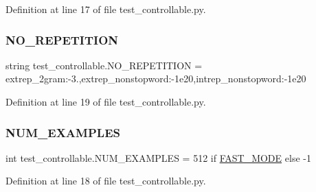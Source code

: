 Definition at line 17 of file test\+\_\+controllable.\+py.

\mbox{\label{namespacetest__controllable_aab6d0af3084ea9ec5a2deb23ae724eb3}} 
\subsubsection{\texorpdfstring{N\+O\+\_\+\+R\+E\+P\+E\+T\+I\+T\+I\+ON}{NO\_REPETITION}}
{\footnotesize\ttfamily string test\+\_\+controllable.\+N\+O\+\_\+\+R\+E\+P\+E\+T\+I\+T\+I\+ON = \textquotesingle{}extrep\+\_\+2gram\+:-\/3.,extrep\+\_\+nonstopword\+:-\/1e20,intrep\+\_\+nonstopword\+:-\/1e20\textquotesingle{}}



Definition at line 19 of file test\+\_\+controllable.\+py.

\mbox{\label{namespacetest__controllable_a7482064eb69e2d38391c4be1fc81e234}} 
\subsubsection{\texorpdfstring{N\+U\+M\+\_\+\+E\+X\+A\+M\+P\+L\+ES}{NUM\_EXAMPLES}}
{\footnotesize\ttfamily int test\+\_\+controllable.\+N\+U\+M\+\_\+\+E\+X\+A\+M\+P\+L\+ES = 512 if \hyperlink{namespacetest__controllable_ad2c8c083bae98c16daef9da4b2494618}{F\+A\+S\+T\+\_\+\+M\+O\+DE} else -\/1}



Definition at line 18 of file test\+\_\+controllable.\+py.

